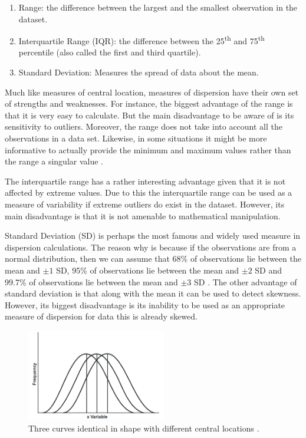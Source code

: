 \begin{enumerate}
    \item Range: the difference between the largest and the smallest observation 
    in the dataset.
    \item Interquartile Range (IQR): the difference between the 25\textsuperscript{th} and 
    75\textsuperscript{th} percentile (also called the first and third quartile).
    \item Standard Deviation: Measures the spread of data about the mean. 
\end{enumerate}

Much like measures of central location, measures of dispersion have their own set of
strengths and weaknesses. For instance, the biggest advantage of the range is that 
it is very easy to calculate. But the main disadvantage to be aware of is its 
sensitivity to outliers. Moreover, the range does not take into account all 
the observations in a data set. Likewise, in some situations it might be more informative 
to actually provide the minimum and maximum values rather than the range a singular value \cite{c1}.

The interquartile range has a rather interesting advantage given that it is not 
affected by extreme values. Due to this the interquartile range can be used as 
a measure of variability if extreme outliers do exist in the dataset. However, its 
main disadvantage is that it is not amenable to mathematical manipulation.

Standard Deviation (SD) is perhaps the most famous and widely used measure in dispersion
calculations. The reason why is because if the observations are from a normal distribution, 
then we can assume that 68\% of observations lie between the mean and $\pm1$ SD, 95\% of 
observations lie between the mean and $\pm{2}$ SD and 99.7\% of observations lie between 
the mean and $\pm{3}$ SD \cite{c1}. The other advantage of standard deviation is that along with the 
mean it can be used to detect skewness. However, its biggest disadvantage is its 
inability to be used as an appropriate measure of dispersion for data this is 
already skewed.

\begin{figure}
    \centering
        \includegraphics[height=4cm]{figures/diff_central_location.png}
    \caption{Three curves identical in shape with different central locations \cite{c13}.}
    \label{figure:central_location}
\end{figure} 

